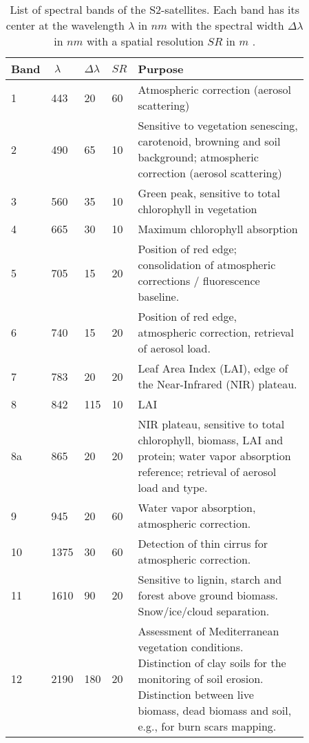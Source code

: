 \begin{table}[h]
    \centering
    \small
    \caption[List of spectral bands of the S2-satellites.]{List of spectral bands of the S2-satellites. Each band has its center at the wavelength $\lambda$ in $nm$ with the spectral width $\Delta\lambda$ in $nm$ with a spatial resolution $SR$ in $m$ \citep{jaramazESASentinel2Mission2013}.}
    \begin{tabular}{p{0.03\linewidth} p{0.04\linewidth} p{0.03\linewidth} p{0.03\linewidth} p{0.73\linewidth}}
    \toprule
        \hspace*{-5pt} Band & $\;\lambda$ & $\Delta\lambda$ & $SR$ & Purpose \\ \hline
        1 & 443 & 20 & 60 & Atmospheric correction (aerosol scattering) \\ %
        2 & 490 & 65 & 10 & Sensitive to vegetation senescing, carotenoid, browning and soil background; atmospheric correction (aerosol scattering) \\ %
        3 & 560 & 35 & 10 & Green peak, sensitive to total chlorophyll in vegetation \\ %
        4 & 665 & 30 & 10 & Maximum chlorophyll absorption \\ %
        5 & 705 & 15 & 20 & Position of red edge; consolidation of atmospheric corrections / fluorescence baseline. \\ %
        6 & 740 & 15 & 20 & Position of red edge, atmospheric correction, retrieval of aerosol load. \\ %
        7 & 783 & 20 & 20 & Leaf Area Index (LAI), edge of the Near-Infrared (NIR) plateau. \\ %
        8 & 842 & 115 & 10 & LAI \\ %
        8a & 865 & 20 & 20 & NIR plateau, sensitive to total chlorophyll, biomass, LAI and protein; water vapor absorption reference; retrieval of aerosol load and type. \\ %
        9 & 945 & 20 & 60 & Water vapor absorption, atmospheric correction. \\ %
        10 & 1375 & 30 & 60 & Detection of thin cirrus for atmospheric correction. \\ %
        11 & 1610 & 90 & 20 & Sensitive to lignin, starch and forest above ground biomass. Snow/ice/cloud separation. \\ %
        12 & 2190 & 180 & 20 & Assessment of Mediterranean vegetation conditions. Distinction of clay soils for the monitoring of soil erosion. Distinction between live biomass, dead biomass and soil, e.g., for burn scars mapping. \\
        \bottomrule
    \end{tabular}
    \label{table:S2-bands}
\end{table}
